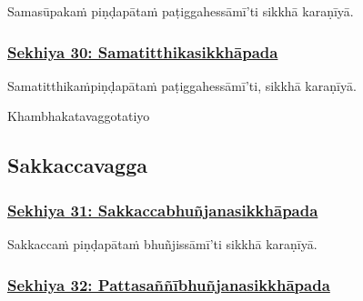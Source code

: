 Samasūpakaṁ piṇḍapātaṁ paṭiggahessāmī'ti sikkhā karaṇīyā.



\subsubsection*{\hyperref[training30]{Sekhiya 30: Samatitthikasikkhāpada}}
\label{sekh30}

Samatitthikaṁ\makeatletter\hyperlink{endnote480-appendix}\makeatother \thinspace piṇḍapātaṁ paṭiggahessāmī'ti, sikkhā karaṇīyā.

\begin{center}
	Khambhakatavaggo\makeatletter\hyperlink{endnote481-appendix}\makeatother \thinspace tatiyo\makeatletter\hyperlink{endnote482-appendix}\makeatother \thinspace
\end{center}



\subsection{Sakkaccavagga}

\subsubsection*{\hyperref[training31]{Sekhiya 31: Sakkaccabhuñjanasikkhāpada}}
\label{sekh31}

Sakkaccaṁ piṇḍapātaṁ bhuñjissāmī'ti sikkhā karaṇīyā.



\subsubsection*{\hyperref[training32]{Sekhiya 32: Pattasaññībhuñjanasikkhāpada}}
\label{sekh32}

